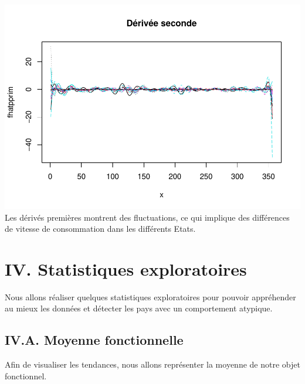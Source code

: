 \documentclass[
]{article}
\newenvironment{Shaded}{\begin{snugshade}}{\end{snugshade}}
\newcommand{\CommentTok}[1]{\textcolor[rgb]{0.56,0.35,0.01}{\textit{#1}}}
\newcommand{\FunctionTok}[1]{\textcolor[rgb]{0.00,0.00,0.00}{#1}}
\newcommand{\NormalTok}[1]{#1}
\newcommand{\OtherTok}[1]{\textcolor[rgb]{0.56,0.35,0.01}{#1}}
\newcommand{\SpecialCharTok}[1]{\textcolor[rgb]{0.00,0.00,0.00}{#1}}
\begin{document}
\includegraphics{Projet_CHESNAIS_GUIBERT_files/figure-latex/unnamed-chunk-32-2.pdf}
Les dérivés premières montrent des fluctuations, ce qui implique des
différences de vitesse de consommation dans les différents Etats.

\hypertarget{iv.-statistiques-exploratoires}{%
\section{IV. Statistiques
exploratoires}\label{iv.-statistiques-exploratoires}}

Nous allons réaliser quelques statistiques exploratoires pour pouvoir
appréhender au mieux les données et détecter les pays avec un
comportement atypique.

\hypertarget{iv.a.-moyenne-fonctionnelle}{%
\subsection{IV.A. Moyenne
fonctionnelle}\label{iv.a.-moyenne-fonctionnelle}}

Afin de visualiser les tendances, nous allons représenter la moyenne de
notre objet fonctionnel.

\begin{Shaded}
\end{Shaded}
\end{document}
